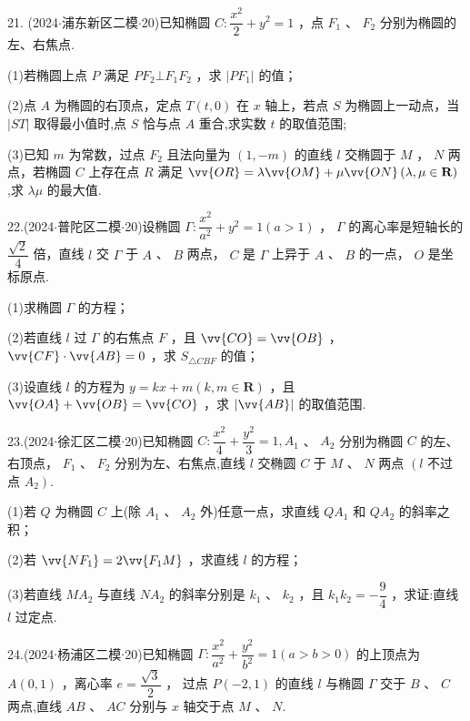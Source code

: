 21. (2024$\cdot$浦东新区二模$\cdot$20)已知椭圆 $C : \dfrac{{x}^{2}}{2} + {y}^{2} = 1$ ，点 ${F}_{1}$ 、 ${F}_{2}$ 分别为椭圆的左、右焦点.

(1)若椭圆上点 $P$ 满足 $P{F}_{2} \bot  {F}_{1}{F}_{2}$ ，求 $\left| {P{F}_{1}}\right|$ 的值；

(2)点 $A$ 为椭圆的右顶点，定点 $T\left( {t,0}\right)$ 在 $x$ 轴上，若点 $S$ 为椭圆上一动点，当 $\left| {ST}\right|$ 取得最小值时,点 $S$ 恰与点 $A$ 重合,求实数 $t$ 的取值范围;

(3)已知 $m$ 为常数，过点 ${F}_{2}$ 且法向量为 $\left( {1, - m}\right)$ 的直线 $l$ 交椭圆于 $M$ ， $N$ 两点，若椭圆 $C$ 上存在点 $R$ 满足 $\vv{OR} = \lambda \vv{OM} + \mu \vv{ON}\left( {\lambda ,\mu  \in  \mathbf{R}}\right)$ ,求 ${\lambda \mu }$ 的最大值.

22.(2024$\cdot$普陀区二模$\cdot$20)设椭圆 $\Gamma  : \dfrac{{x}^{2}}{{a}^{2}} + {y}^{2} = 1\left( {a > 1}\right)$ ， $\Gamma$ 的离心率是短轴长的 $\dfrac{\sqrt{2}}{4}$ 倍，直线 $l$ 交 $\Gamma$ 于 $A$ 、 $B$ 两点， $C$ 是 $\Gamma$ 上异于 $A$ 、 $B$ 的一点， $O$ 是坐标原点.

(1)求椭圆 $\Gamma$ 的方程；

(2)若直线 $l$ 过 $\Gamma$ 的右焦点 $F$ ，且 $\vv{CO} = \vv{OB}$ ， $\vv{CF} \cdot  \vv{AB} = 0$ ，求 ${S}_{\bigtriangleup {CBF}}$ 的值；

(3)设直线 $l$ 的方程为 $y = {kx} + m\left( {k,m \in  \mathbf{R}}\right)$ ，且 $\vv{OA} + \vv{OB} = \vv{CO}$ ，求 $\left| \vv{AB}\right|$ 的取值范围.

23.(2024$\cdot$徐汇区二模$\cdot$20)已知椭圆 $C : \dfrac{{x}^{2}}{4} + \dfrac{{y}^{2}}{3} = 1,{A}_{1}$ 、 ${A}_{2}$ 分别为椭圆 $C$ 的左、右顶点， ${F}_{1}$ 、 ${F}_{2}$ 分别为左、右焦点,直线 $l$ 交椭圆 $C$ 于 $M$ 、 $N$ 两点 $\left( l\right.$ 不过点 $\left. {A}_{2}\right)$.

(1)若 $Q$ 为椭圆 $C$ 上(除 ${A}_{1}$ 、 ${A}_{2}$ 外)任意一点，求直线 $Q{A}_{1}$ 和 $Q{A}_{2}$ 的斜率之积；

(2)若 $\vv{N{F}_{1}} = 2\vv{{F}_{1}M}$ ，求直线 $l$ 的方程；

(3)若直线 $M{A}_{2}$ 与直线 $N{A}_{2}$ 的斜率分别是 ${k}_{1}$ 、 ${k}_{2}$ ，且 ${k}_{1}{k}_{2} =  - \dfrac{9}{4}$ ，求证:直线 $l$ 过定点.

24.(2024$\cdot$杨浦区二模$\cdot$20)已知椭圆 $\Gamma  : \dfrac{{x}^{2}}{{a}^{2}} + \dfrac{{y}^{2}}{{b}^{2}} = 1\left( {a > b > 0}\right)$ 的上顶点为 $A\left( {0,1}\right)$ ，离心率 $e = \dfrac{\sqrt{3}}{2}$ ， 过点 $P\left( {-2,1}\right)$ 的直线 $l$ 与椭圆 $\Gamma$ 交于 $B$ 、 $C$ 两点,直线 ${AB}$ 、 ${AC}$ 分别与 $x$ 轴交于点 $M$ 、 $N$.


